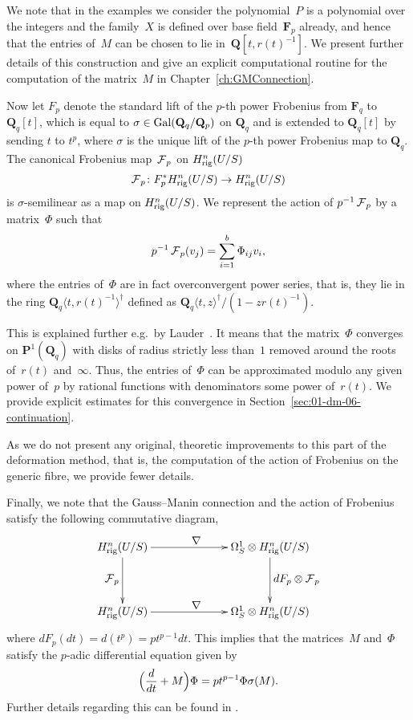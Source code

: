 We note that in the examples we consider the polynomial~$P$ is a polynomial 
over the integers and the family~$X$ is defined over base field~$\mathbf{F}_p$ 
already, and hence that the entries of~$M$ can be chosen to lie 
in~$\mathbf{Q}[t,r(t)^{-1}]$.  We present further details of this construction 
and give an explicit computational routine for the computation of the 
matrix~$M$ in Chapter~\ref{ch:GMConnection}.

Now let $F_p$ denote the standard lift of the $p$-th power Frobenius 
from $\mathbf{F}_q$ to $\mathbf{Q}_q[t]$, which is equal to 
$\sigma \in \operatorname{Gal}(\mathbf{Q}_q/\mathbf{Q}_p)$ on $\mathbf{Q}_q$ and 
is extended to $\mathbf{Q}_q[t]$ by sending $t$ to $t^p$, where $\sigma$ 
is the unique lift of the $p$-th power Frobenius map to $\mathbf{Q}_q$.  
The canonical Frobenius map~$\operatorname{\mathcal{F}}_p$ on $H_{\text{rig}}^{n}(U/S)$
\begin{equation*}
\operatorname{\mathcal{F}}_p \colon F_p^{*} H_{\text{rig}}^{n}(U/S) \rightarrow H_{\text{rig}}^{n}(U/S)
\end{equation*}
is $\sigma$-semilinear as a map on $H_{\text{rig}}^{n}(U/S)$.  We represent 
the action of $p^{-1} \operatorname{\mathcal{F}}_p$ by a matrix~$\Phi$ such that 
\begin{equation*}
p^{-1} \operatorname{\mathcal{F}}_p (v_j) = \sum_{i=1}^{b} \Phi_{ij} v_i,
\end{equation*}
where the entries of~$\Phi$ are in fact overconvergent power series, 
that is, they lie in the ring $\mathbf{Q}_q\langle t, r(t)^{-1}\rangle^{\dagger}$ 
defined as $\mathbf{Q}_q \langle t, z \rangle^{\dagger} / (1 - z r(t)^{-1})$.

This is explained further e.g.\ by Lauder~\citep[\S 3.5]{Lauder2006}.  
It means that the matrix~$\Phi$ converges on $\mathbf{P}^{1}(\mathbf{Q}_q)$ 
with disks of radius strictly less than~$1$ removed around the roots of~$r(t)$ 
and~$\infty$.  Thus, the entries of~$\Phi$ can be approximated modulo 
any given power of~$p$ by rational functions with denominators some 
power of~$r(t)$.  We provide explicit estimates for this convergence 
in Section~\ref{sec:01-dm-06-continuation}.

As we do not present any original, theoretic improvements to this part of 
the deformation method, that is, the computation of the action of Frobenius 
on the generic fibre, we provide fewer details.

Finally, we note that the Gauss--Manin connection and the action of 
Frobenius satisfy the following commutative diagram,
\begin{equation*}
\def\labelstyle{\textstyle}
\xymatrix@C=6.8em@R=4em{
\Hrig^{n}(U/S) \ar[d]_{\Frob_p} \ar[r]^{\nabla} & 
\Omega_{S}^{1} \otimes \Hrig^{n}(U/S) \ar[d]^{d F_p \otimes \Frob_p} \\
\Hrig^{n}(U/S) \ar[r]^{\nabla} & 
\Omega_{S}^{1} \otimes \Hrig^{n}(U/S) 
}
\end{equation*}
where $d F_p (dt) = d(t^p) = p t^{p-1} dt$.  This implies that the 
matrices~$M$ and~$\Phi$ satisfy the $p$-adic differential equation given by 
\begin{equation*}
\Bigl( \frac{d}{dt} + M \Bigr) \Phi = p t^{p-1} \Phi \sigma(M).
\end{equation*}
Further details regarding this can be found in \citep[\S 5]{Gerkmann2007}.

